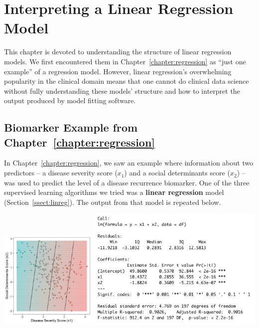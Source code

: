 \chapter{Interpreting a Linear Regression Model \label{chapter:linreg}}

This chapter is devoted to understanding the structure of linear regression models. We first encountered them in Chapter~\ref{chapter:regression} as ``just one example'' of a regression model. However, linear regression's overwhelming popularity in the clinical domain means that one cannot do clinical data science without fully understanding these models' structure and how to interpret the output produced by model fitting software. 


\section{Biomarker Example from Chapter~\ref{chapter:regression}}

In Chapter~\ref{chapter:regression}, we saw an example where information about two predictors -- a disease severity score ($x_1$) and a social determinants score ($x_2$) -- was used to predict the level of a disease recurrence biomarker. One of the three supervised learning algorithms we tried was a \textbf{linear regression} model (Section~\ref{ssect:linreg}). The output from that model is repeated below.
\begin{center}
\includegraphics[width=0.35\textwidth]{img/esl-reg-linear.png}
\includegraphics[width=0.64\textwidth]{img/linear-regression-model-output.png}
\end{center}

